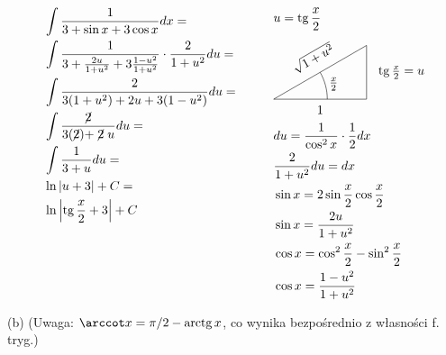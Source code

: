 \documentclass[12pt]{article}
\renewcommand{\tan}{\operatorname{tg}}
\renewcommand{\arctan}{\operatorname{arctg}}
\begin{document}
\begin{equation*}
    \begin{aligned}[c]
        &\int \frac{1}{3+\sin x+3\cos x} dx = \\
        &\int \frac{1}{3+\frac{2u}{1+u^2}+3\frac{1-u^2}{1+u^2}} \cdot \frac{2}{1+u^2}du = \\
        &\int \frac{2}{3(1+u^2)+2u+3(1-u^2)} du = \\
        &\int \frac{\centernot{2}}{3(\centernot{2})+\centernot{2}u} du = \\
        &\int \frac{1}{3 + u} du = \\
        &\ln |u+3| + C = \\
        &\ln \left|\tan\frac{x}{2} + 3\right| + C \\
        \text{\phantom{-}} \\ \text{\phantom{-}} \\ \text{\phantom{-}} \\ \text{\phantom{-}} \\
    \end{aligned} \quad\quad\quad
    \begin{aligned}[c]
        &u = \tan \frac{x}{2} \\
        &\begin{tikzpicture}[baseline=-0.65ex,scale=0.5]
            \draw (5.1962, 0) -- (5.1962, 3);
            \draw (0, 0) -- (5.1962, 0);
            \draw (0, 0) -- (5.1962, 3);
            \draw (3,0) arc (0:30:3);
            \node at (3.35, 0.85) {$\frac{x}{2}$};
            \node[rotate=30] at (2.5981 - 0.4, 1.5 + 0.8) {$\sqrt{1 + u^2}$};
            \node at (5.1962 + 1.95, 1.5) {$\tan\frac{x}{2} = u$};
            \node at (2.5981, -0.6) {$1$};
        \end{tikzpicture} \\
        &du = \frac{1}{\cos^2x} \cdot \frac{1}{2} dx\\
        &\frac{2}{1+u^2}du = dx\\
        &\sin x = 2\sin\frac{x}{2}\cos\frac{x}{2} \\
        &\sin x = \frac{2u}{1+u^2} \\
        &\cos x = \cos^2\frac{x}{2} - \sin^2\frac{x}{2} \\
        &\cos x = \frac{1-u^2}{1+u^2}\\        
    \end{aligned}
\end{equation*}

(b) (Uwaga: $\arccot x = \pi/2 - \arctan x$, co wynika bezpośrednio z własności f. tryg.)
\end{document}
